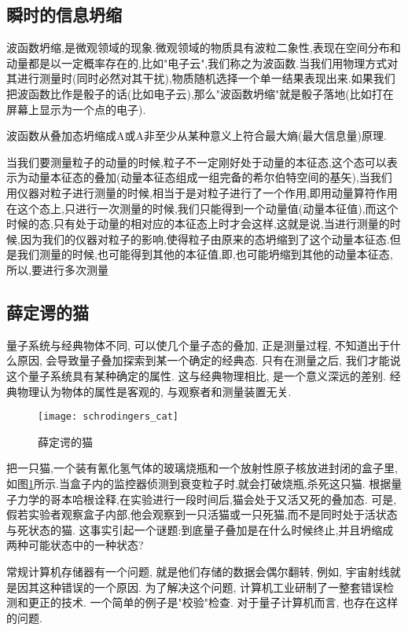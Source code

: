\documentclass{article}
\begin{document}
\subsection{瞬时的信息坍缩}
波函数坍缩,是微观领域的现象.微观领域的物质具有波粒二象性,表现在空间分布和动量都是以一定概率存在的,比如"电子云",我们称之为波函数.当我们用物理方式对其进行测量时(同时必然对其干扰),物质随机选择一个单一结果表现出来.如果我们把波函数比作是骰子的话(比如电子云),那么"波函数坍缩"就是骰子落地(比如打在屏幕上显示为一个点的电子).\par
波函数从叠加态坍缩成A或A非至少从某种意义上符合最大熵(最大信息量)原理.\par
当我们要测量粒子的动量的时候,粒子不一定刚好处于动量的本征态,这个态可以表示为动量本征态的叠加(动量本征态组成一组完备的希尔伯特空间的基矢),当我们用仪器对粒子进行测量的时候,相当于是对粒子进行了一个作用,即用动量算符作用在这个态上,只进行一次测量的时候,我们只能得到一个动量值(动量本征值),而这个时候的态,只有处于动量的相对应的本征态上时才会这样,这就是说,当进行测量的时候,因为我们的仪器对粒子的影响,使得粒子由原来的态坍缩到了这个动量本征态.但是我们测量的时候,也可能得到其他的本征值,即,也可能坍缩到其他的动量本征态,所以,要进行多次测量

\subsection{薛定谔的猫}
量子系统与经典物体不同, 可以使几个量子态的叠加, 正是测量过程, 不知道出于什么原因, 会导致量子叠加探索到某一个确定的经典态.
只有在测量之后, 我们才能说这个量子系统具有某种确定的属性.
这与经典物理相比, 是一个意义深远的差别. 经典物理认为物体的属性是客观的, 与观察者和测量装置无关.

\begin{figure}[htbp]
		\centering
		\texttt{[image: schrodingers\_cat]}
		\caption{薛定谔的猫}
		\label{fig.cat}
\end{figure}
把一只猫,一个装有氰化氢气体的玻璃烧瓶和一个放射性原子核放进封闭的盒子里, 如图\ref{fig.cat}所示.当盒子内的监控器侦测到衰变粒子时,就会打破烧瓶,杀死这只猫.
根据量子力学的哥本哈根诠释,在实验进行一段时间后,猫会处于又活又死的叠加态.
可是,假若实验者观察盒子内部,他会观察到一只活猫或一只死猫,而不是同时处于活状态与死状态的猫.
这事实引起一个谜题:到底量子叠加是在什么时候终止,并且坍缩成两种可能状态中的一种状态?

常规计算机存储器有一个问题, 就是他们存储的数据会偶尔翻转, 例如, 宇宙射线就是因其这种错误的一个原因. 为了解决这个问题, 计算机工业研制了一整套错误检测和更正的技术. 一个简单的例子是"校验"检查. 对于量子计算机而言, 也存在这样的问题.
\end{document}
